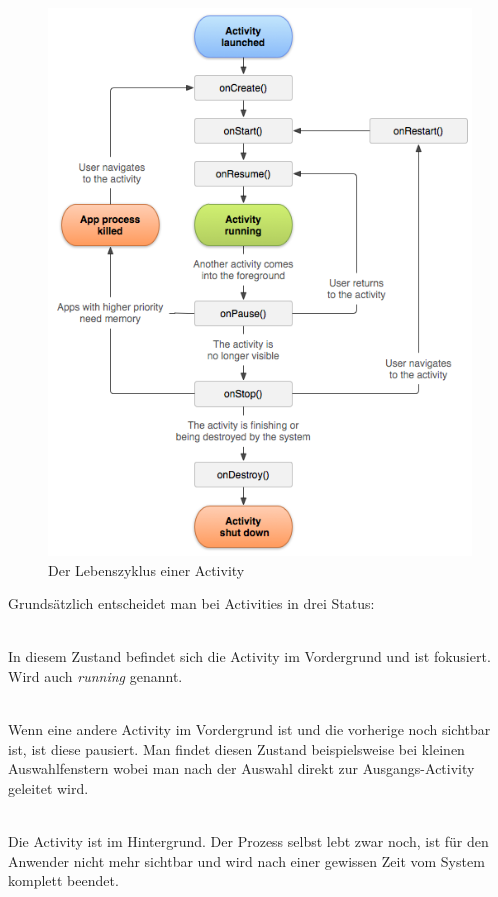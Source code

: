 \begin{figure}[ht!]
\begin{center}
\includegraphics[scale=.6]{images/activity_lifecycle}
\caption{Der Lebenszyklus einer Activity}
\label{lifecycle}
\end{center}
\end{figure}

Grundsätzlich entscheidet man bei Activities in drei Status:

\begin{description}[style=nextline]

	\item[Resumed] \hfill \\
	In diesem Zustand befindet sich die Activity im Vordergrund und ist fokusiert. Wird auch \emph{running} genannt.
	
	\item[Paused] \hfill \\
	Wenn eine andere Activity im Vordergrund ist und die vorherige noch sichtbar ist, ist diese pausiert. Man findet diesen Zustand beispielsweise bei kleinen Auswahlfenstern wobei man nach der Auswahl direkt  zur Ausgangs-Activity geleitet wird.
	
	\item[Stopped] \hfill \\
	Die Activity ist im Hintergrund. Der Prozess selbst lebt zwar noch, ist für den Anwender nicht mehr sichtbar und wird nach einer gewissen Zeit vom System komplett beendet.
	
\end{description}

